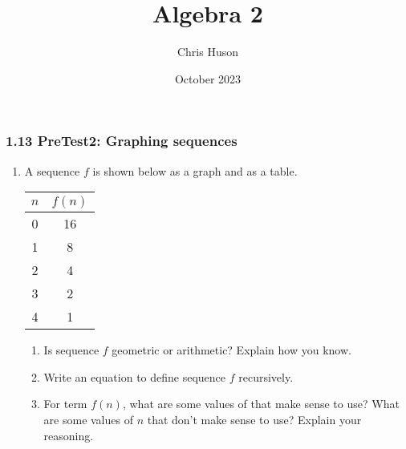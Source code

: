 \documentclass[12pt, twoside]{article}
\title{Algebra 2}
\author{Chris Huson}
\date{October 2023}
\begin{document}
\subsubsection*{1.13 PreTest2: Graphing sequences}
\begin{enumerate}

\item A sequence $f$ is shown below as a graph and as a table.
\begin{multicols}{2}
\begin{center}
    \end{center}
    \begin{tabular}{c|c}
        $n$ & $f(n)$ \\ \hline
        0 & 16 \\ 
        1 & 8 \\ 
        2 & 4 \\ 
        3 & 2 \\ 
        4 & 1 \\ 
        \end{tabular}
    \end{multicols}
    \begin{enumerate}
        \item Is sequence $f$ geometric or arithmetic? Explain how you know. \vspace{2cm}
        \item Write an equation to define sequence $f$ recursively. \vspace{3cm}
        \item For term $f(n)$, what are some values of that make sense to use? What are some values of $n$ that don't make sense to use? Explain your reasoning.
    \end{enumerate}


\end{enumerate}
\end{document}

